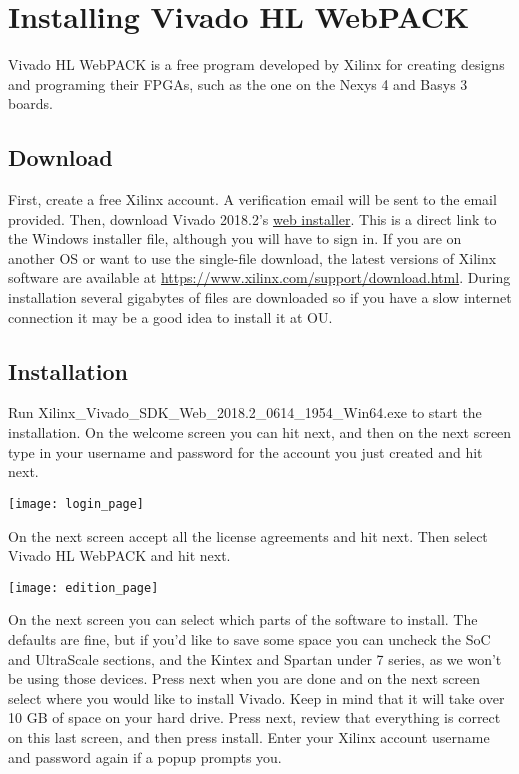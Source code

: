 \section{Installing Vivado HL WebPACK}
Vivado HL WebPACK is a free program developed by Xilinx for creating designs and programing their
FPGAs, such as the one on the Nexys 4 and Basys 3 boards.

\subsection{Download}
First, create a free Xilinx account.
A verification email will be sent to the email provided.
Then, download Vivado 2018.2's
\href{https://www.xilinx.com/member/forms/download/xef.html?filename=Xilinx_Vivado_SDK_Web_2018.2_0614_1954_Win64.exe}
{web installer}.
This is a direct link to the Windows installer file, although you will have to sign in.
If you are on another OS or want to use the single-file download, the latest versions of Xilinx
software are available at \url{https://www.xilinx.com/support/download.html}.
During installation several gigabytes of files are downloaded so if you have a slow internet
connection it may be a good idea to install it at OU.

\subsection{Installation}
Run Xilinx\_Vivado\_SDK\_Web\_2018.2\_0614\_1954\_Win64.exe to start the installation.
On the welcome screen you can hit next, and then on the next screen type in your username and
password for the account you just created and hit next.

\vspace{2mm}\noindent
\texttt{[image: login\_page]}

On the next screen accept all the license agreements and hit next.
Then select Vivado HL WebPACK and hit next.

\vspace{2mm}\noindent
\texttt{[image: edition\_page]}

On the next screen you can select which parts of the software to install.
The defaults are fine, but if you’d like to save some space you can uncheck the SoC and UltraScale
sections, and the Kintex and Spartan under 7 series, as we won’t be using those devices.
Press next when you are done and on the next screen select where you would like to install Vivado.
Keep in mind that it will take over 10 GB of space on your hard drive.
Press next, review that everything is correct on this last screen, and then press install.
Enter your Xilinx account username and password again if a popup prompts you.

